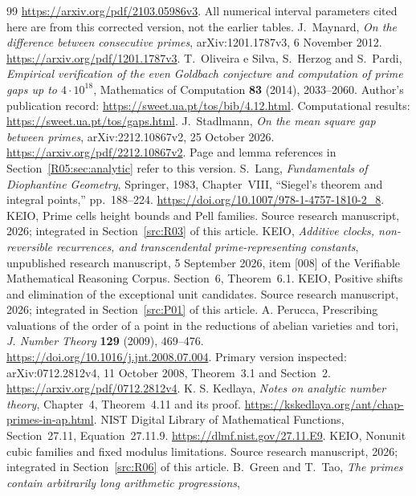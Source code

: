 \documentclass[11pt,a4paper]{article}
\theoremstyle{definition}\newtheorem{definition}[theorem]{Definition}
\theoremstyle{remark}\newtheorem{remark}[theorem]{Remark}
\begin{document}
\begin{thebibliography}{99}
\url{https://arxiv.org/pdf/2103.05986v3}.
All numerical interval parameters cited here are from this corrected
version, not the earlier tables.
J.~Maynard, \emph{On the difference between consecutive primes},
arXiv:1201.1787v3, 6 November 2012.
\url{https://arxiv.org/pdf/1201.1787v3}.
T.~Oliveira e Silva, S.~Herzog and S.~Pardi,
\emph{Empirical verification of the even Goldbach conjecture and
computation of prime gaps up to $4\cdot10^{18}$},
Mathematics of Computation \textbf{83} (2014), 2033--2060.
Author's publication record: \url{https://sweet.ua.pt/tos/bib/4.12.html}.
Computational results: \url{https://sweet.ua.pt/tos/gaps.html}.
J.~Stadlmann, \emph{On the mean square gap between primes},
arXiv:2212.10867v2, 25 October 2026.
\url{https://arxiv.org/pdf/2212.10867v2}.
Page and lemma references in Section~\ref{R05:sec:analytic} refer to
this version.
S.~Lang, \emph{Fundamentals of Diophantine Geometry}, Springer, 1983,
Chapter~VIII, ``Siegel's theorem and integral points,'' pp.~188--224.
\url{https://doi.org/10.1007/978-1-4757-1810-2_8}.
KEIO, Prime cells height bounds and Pell families. Source research manuscript, 2026; integrated in Section~\ref{src:R03} of this article.
KEIO, \emph{Additive clocks, non-reversible recurrences, and transcendental
prime-representing constants}, unpublished research manuscript,
5 September 2026, item [008] of the Verifiable Mathematical Reasoning
Corpus. Section~6, Theorem~6.1.
KEIO, Positive shifts and elimination of the exceptional unit candidates. Source research manuscript, 2026; integrated in Section~\ref{src:P01} of this article.
A. Perucca, Prescribing valuations of the order of a point in the
reductions of abelian varieties and tori,
\emph{J. Number Theory} \textbf{129} (2009), 469--476.
\url{https://doi.org/10.1016/j.jnt.2008.07.004}.
Primary version inspected: arXiv:0712.2812v4, 11 October 2008,
Theorem~3.1 and Section~2.
\url{https://arxiv.org/pdf/0712.2812v4}.
K. S. Kedlaya, \emph{Notes on analytic number theory},
Chapter~4, Theorem~4.11 and its proof.
\url{https://kskedlaya.org/ant/chap-primes-in-ap.html}.
NIST Digital Library of Mathematical Functions,
Section~27.11, Equation~27.11.9.
\url{https://dlmf.nist.gov/27.11.E9}.
KEIO, Nonunit cubic families and fixed modulus limitations. Source research manuscript, 2026; integrated in Section~\ref{src:R06} of this article.
B.~Green and T.~Tao,
\emph{The primes contain arbitrarily long arithmetic progressions},

\end{thebibliography}
\end{document}

